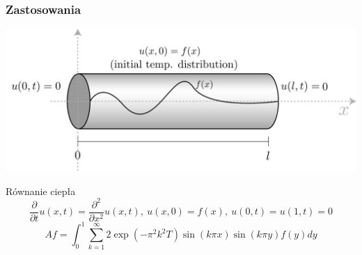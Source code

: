 \documentclass{beamer}
\begin{document}
\begin{frame}\frametitle{Zastosowania}
\begin{center}
\includegraphics[scale=0.1]{9}
\end{center}
\begin{block}{Równanie ciepła}
\begin{displaymath}
\frac{\partial}{\partial t}u(x,t)=\frac{\partial^2}{\partial x^2}u(x,t),\ u(x,0)=f(x),\ u(0,t)=u(1,t)=0
\end{displaymath}
\begin{displaymath}
Af=\int_0^1\sum_{k=1}^{\infty}2\exp (-\pi^2k^2T)\sin (k\pi x)\sin (k\pi y)f(y)dy
\end{displaymath}
\end{block}
\end{frame}
\end{document}

